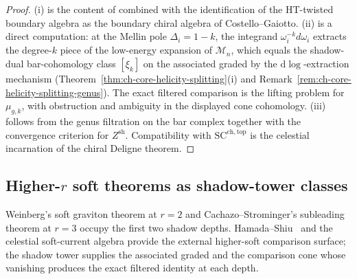 \begin{proof}
\textup{(i)} is the content of \cite[\S 2]{StromingerLectures2018} combined with
the identification of the HT-twisted boundary algebra as the boundary
chiral algebra of Costello--Gaiotto. \textup{(ii)} is a direct computation: at
the Mellin pole $\Delta_i = 1-k$, the integrand $\omega_i^{-k}d\omega_i$
extracts the degree-$k$ piece of the low-energy expansion of
$\mathcal{M}_n$, which equals the shadow-dual bar-cohomology class
$[\xi_k]$ on the associated graded by the $\mathrm{d}\log$-extraction
mechanism (Theorem~\ref{thm:ch-core-helicity-splitting}(i) and
Remark~\ref{rem:ch-core-helicity-splitting-genus}). The exact
filtered comparison is the lifting problem for \(\mu_{g,k}\), with
obstruction and ambiguity in the displayed cone cohomology. \textup{(iii)}
follows from the genus filtration on the bar complex together with the convergence criterion
for \(Z^{\mathrm{sh}}\). Compatibility with
$\mathrm{SC}^{\mathrm{ch,top}}$ is the celestial incarnation of the
chiral Deligne theorem.
\end{proof}

\subsection{Higher-$r$ soft theorems as shadow-tower classes}
\label{subsec:higher-r-soft}

Weinberg's soft graviton theorem at \(r=2\) and
Cachazo--Strominger's subleading theorem at \(r=3\) occupy the first
two shadow depths. Hamada--Shiu~\cite{HamadaShiuSubsubSoft} and the
celestial soft-current algebra
\cite{GuevaraHimwichPateStrominger21,StromingerWInfinityCelestial}
provide the external higher-soft comparison surface; the shadow tower
supplies the associated graded and the comparison cone whose vanishing
produces the exact filtered identity at each depth.

